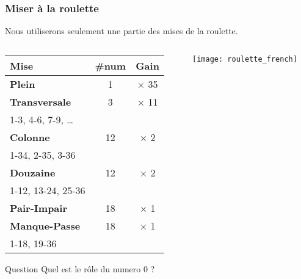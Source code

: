 \documentclass[10pt]{beamer}
\begin{document}
\begin{frame}
  \frametitle{Miser à la roulette}
  Nous utiliserons seulement une partie des mises de la roulette.
  
  \begin{columns}[c]
    \begin{column}{0.53\textwidth}
      \begin{tabular}{lcc}
        \toprule
        \textbf{Mise}         & \textbf{\#num} & \textbf{Gain} \\
        \midrule
        \textbf{Plein}        & 1                  & $\times$ 35   \\
        \textbf{Transversale} & 3                  & $\times$ 11   \\
        1-3, 4-6, 7-9, \dots                                      \\
        \textbf{Colonne}      & 12                 & $\times$ 2    \\
        1-34, 2-35, 3-36                                           \\
        \textbf{Douzaine}     & 12                 & $\times$ 2    \\
        1-12, 13-24, 25-36                                         \\
        \textbf{Pair-Impair}  & 18                 & $\times$ 1    \\
        \textbf{Manque-Passe} & 18                 & $\times$ 1    \\
        1-18, 19-36                                                \\
        \bottomrule
      \end{tabular}
      \begin{block}{Question}
        Quel est le rôle du numero 0 ?
      \end{block}
    \end{column}
    \begin{column}{0.47\textwidth}
      \texttt{[image: roulette\_french]}
    \end{column}
  \end{columns}

\end{frame}
\end{document}
